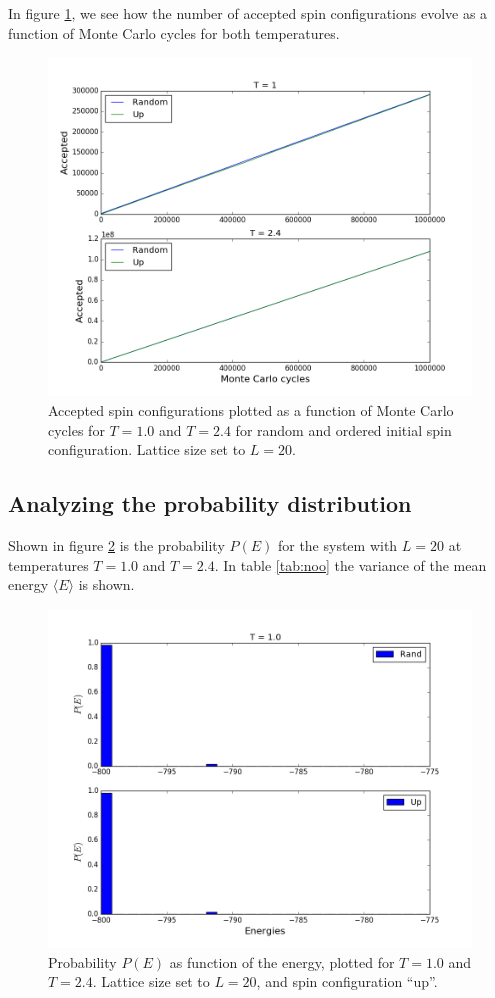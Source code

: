 \documentclass{article}
\begin{document}
In figure \ref{fig:accept}, we see how the number of accepted spin configurations evolve as a function of Monte Carlo cycles for both temperatures.
\begin{figure}[H]
  \centering
  \includegraphics[scale=0.5]{../figures/task_c/accepted.png}
  \caption{Accepted spin configurations plotted as a function of Monte Carlo cycles for $T = 1.0$ and $T=2.4$ for random and ordered initial spin configuration. Lattice size set to $L=20$.}
  \label{fig:accept}
\end{figure}

\subsection{Analyzing the probability distribution}
Shown in figure \ref{fig:historietimen} is the probability $P(E)$ for the system with $L=20$ at temperatures $T=1.0$ and $T=2.4$. In table \ref{tab:noo} the variance of the mean energy $\langle E\rangle$ is shown.
\begin{figure}[H]
  \centering
  \includegraphics[scale=0.5]{../figures/task_d/hist1.png}
  \caption{Probability $P(E)$ as function of the energy, plotted for $T=1.0$ and $T=2.4$. Lattice size set to $L=20$, and spin configuration ``up''.}
  \label{fig:historietimen}
\end{figure}
\end{document}
